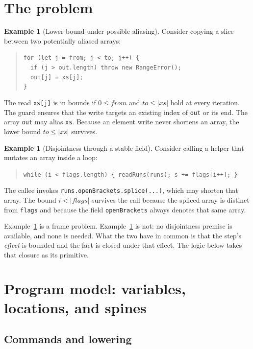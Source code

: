 \documentclass[10pt,a4paper]{article}
\theoremstyle{definition}
\newtheorem{example}[theorem]{Example}
\theoremstyle{remark}
\newcommand{\len}[1]{|#1|}
\newcommand{\code}[1]{\texttt{#1}}
\begin{document}
\section{The problem}\label{sec:problem}

\begin{example}[Lower bound under possible aliasing]\label{ex:alias}
Consider copying a slice between two potentially aliased arrays:
\begin{quote}\small
\code{for (let j = from; j < to; j++) \{}\\
\code{~~if (j > out.length) throw new RangeError();}\\
\code{~~out[j] = xs[j];}\\
\code{\}}
\end{quote}
The read \code{xs[j]} is in bounds if $0\le\mathit{from}$ and
$\mathit{to}\le\len{\mathit{xs}}$ hold at every iteration. The guard
ensures that the write targets an existing index of \code{out} or its
end. The array \code{out} may alias \code{xs}. Because an element write
never shortens an array, the lower bound $\mathit{to}\le\len{\mathit{xs}}$
survives.
\end{example}

\begin{example}[Disjointness through a stable field]\label{ex:sep}
Consider calling a helper that mutates an array inside a loop:
\begin{quote}\small
\code{while (i < flags.length) \{ readRuns(runs); s += flags[i++]; \}}
\end{quote}
The callee invokes \code{runs.openBrackets.splice(...)}, which may
shorten that array. The bound $i<\len{\mathit{flags}}$ survives the call
because the spliced array is distinct from \code{flags} and because the
field \code{openBrackets} always denotes that same array.
\end{example}

Example~\ref{ex:sep} is a frame problem. Example~\ref{ex:alias} is not:
no disjointness premise is available, and none is needed. What the two
have in common is that the step's \emph{effect} is bounded and the fact
is closed under that effect. The logic below takes that closure as its
primitive.

\section{Program model: variables, locations, and spines}\label{sec:model}

\subsection{Commands and lowering}
\end{document}
